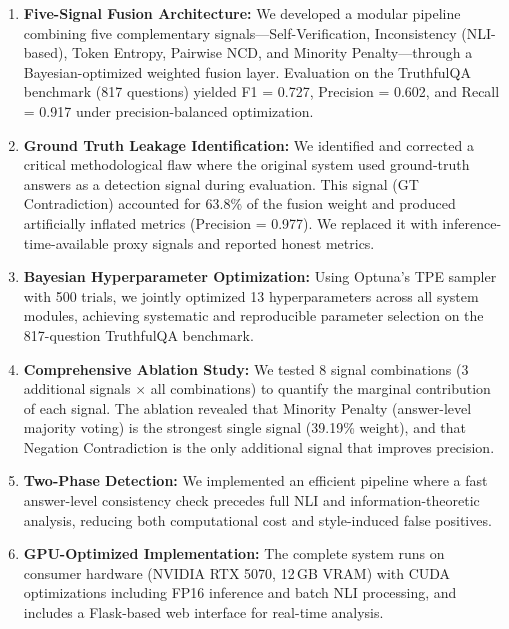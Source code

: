 \begin{enumerate}
    \item \textbf{Five-Signal Fusion Architecture:} We developed a modular pipeline combining five complementary signals---Self-Verification, Inconsistency (NLI-based), Token Entropy, Pairwise NCD, and Minority Penalty---through a Bayesian-optimized weighted fusion layer. Evaluation on the TruthfulQA benchmark (817 questions) yielded F1 = 0.727, Precision = 0.602, and Recall = 0.917 under precision-balanced optimization.

    \item \textbf{Ground Truth Leakage Identification:} We identified and corrected a critical methodological flaw where the original system used ground-truth answers as a detection signal during evaluation. This signal (GT Contradiction) accounted for 63.8\% of the fusion weight and produced artificially inflated metrics (Precision = 0.977). We replaced it with inference-time-available proxy signals and reported honest metrics.

    \item \textbf{Bayesian Hyperparameter Optimization:} Using Optuna's TPE sampler with 500 trials, we jointly optimized 13 hyperparameters across all system modules, achieving systematic and reproducible parameter selection on the 817-question TruthfulQA benchmark.

    \item \textbf{Comprehensive Ablation Study:} We tested 8 signal combinations (3 additional signals $\times$ all combinations) to quantify the marginal contribution of each signal. The ablation revealed that Minority Penalty (answer-level majority voting) is the strongest single signal (39.19\% weight), and that Negation Contradiction is the only additional signal that improves precision.

    \item \textbf{Two-Phase Detection:} We implemented an efficient pipeline where a fast answer-level consistency check precedes full NLI and information-theoretic analysis, reducing both computational cost and style-induced false positives.

    \item \textbf{GPU-Optimized Implementation:} The complete system runs on consumer hardware (NVIDIA RTX 5070, 12\,GB VRAM) with CUDA optimizations including FP16 inference and batch NLI processing, and includes a Flask-based web interface for real-time analysis.
\end{enumerate}

